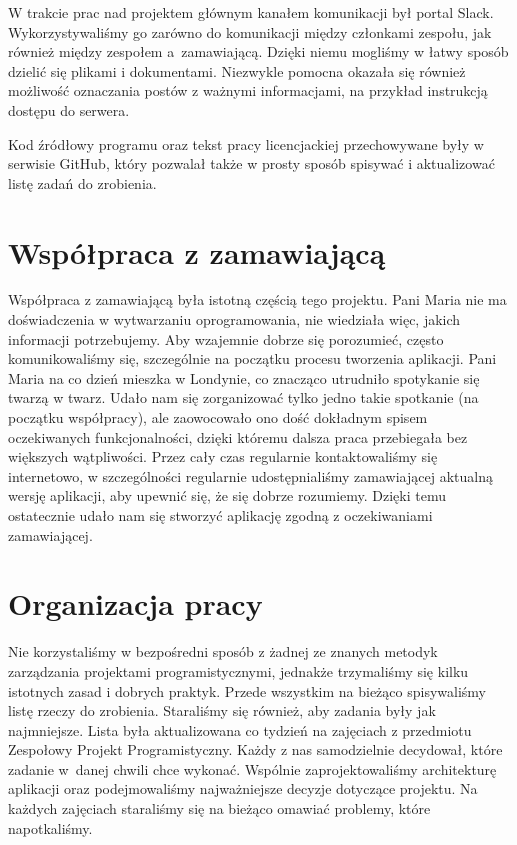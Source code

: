 \documentclass[licencjacka]{pracamgr}
\begin{document}
W trakcie prac nad projektem głównym kanałem komunikacji był portal Slack. Wykorzystywaliśmy go zarówno do komunikacji między członkami zespołu, jak również między zespołem a~zamawiającą. Dzięki niemu mogliśmy w łatwy sposób dzielić się plikami i dokumentami. Niezwykle pomocna okazała się również możliwość oznaczania postów z ważnymi informacjami, na przykład instrukcją dostępu do serwera.

Kod źródłowy programu oraz tekst pracy licencjackiej przechowywane były w serwisie \mbox{GitHub}, który pozwalał także w prosty sposób spisywać i aktualizować listę zadań do zrobienia.

\section{Współpraca z zamawiającą}
Współpraca z zamawiającą była istotną częścią tego projektu. Pani Maria nie ma doświadczenia w wytwarzaniu oprogramowania, nie wiedziała więc, jakich informacji potrzebujemy. Aby wzajemnie dobrze się porozumieć, często komunikowaliśmy się, szczególnie na początku procesu tworzenia aplikacji. Pani Maria na co dzień mieszka w Londynie, co znacząco utrudniło spotykanie się twarzą w twarz. Udało nam się zorganizować tylko jedno takie spotkanie (na początku współpracy), ale zaowocowało ono dość dokładnym spisem oczekiwanych funkcjonalności, dzięki któremu dalsza praca przebiegała bez większych wątpliwości. Przez cały czas regularnie kontaktowaliśmy się internetowo, w szczególności regularnie udostępnialiśmy zamawiającej aktualną wersję aplikacji, aby upewnić się, że się dobrze rozumiemy. Dzięki temu ostatecznie udało nam się stworzyć aplikację zgodną z oczekiwaniami zamawiającej.

\section{Organizacja pracy}

Nie korzystaliśmy w bezpośredni sposób z żadnej ze znanych metodyk zarządzania projektami programistycznymi, jednakże trzymaliśmy się kilku istotnych zasad i dobrych praktyk. Przede wszystkim na bieżąco spisywaliśmy listę rzeczy do zrobienia. Staraliśmy się również, aby zadania były jak najmniejsze. Lista była aktualizowana co tydzień na zajęciach z przedmiotu Zespołowy Projekt Programistyczny. Każdy z nas samodzielnie decydował, które zadanie w~danej chwili chce wykonać. Wspólnie zaprojektowaliśmy architekturę aplikacji oraz podejmowaliśmy najważniejsze decyzje dotyczące projektu. Na każdych zajęciach staraliśmy się na bieżąco omawiać problemy, które napotkaliśmy.
\end{document}
